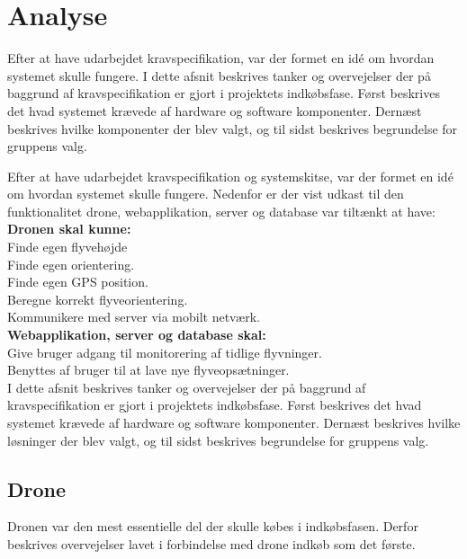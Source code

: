 \chapter{Analyse}
\label{chap:analyse}

Efter at have udarbejdet kravspecifikation, var der formet en idé om hvordan systemet skulle fungere. 
I dette afsnit beskrives tanker og overvejelser der på baggrund af kravspecifikation er gjort i projektets indkøbsfase. 
Først beskrives det hvad systemet krævede af hardware og software komponenter. 
Dernæst beskrives hvilke komponenter der blev valgt, og til sidst beskrives begrundelse for gruppens valg. 

\newpage

Efter at have udarbejdet kravspecifikation og systemskitse, var der formet en idé om hvordan systemet skulle fungere. 
Nedenfor er der vist udkast til den funktionalitet drone, webapplikation, server og database var tiltænkt at have: \\

\textbf{Dronen skal kunne:}\\
Finde egen flyvehøjde\\
Finde egen orientering.\\
Finde egen GPS position.\\
Beregne korrekt flyveorientering. \\
Kommunikere med server via mobilt netværk.\\

\textbf{Webapplikation, server og database skal:}\\
Give bruger adgang til monitorering af tidlige flyvninger.\\
Benyttes af bruger til at lave nye flyveopsætninger.\\



I dette afsnit beskrives tanker og overvejelser der på baggrund af kravspecifikation er gjort i projektets indkøbsfase. 
Først beskrives det hvad systemet krævede af hardware og software komponenter. 
Dernæst beskrives hvilke løsninger der blev valgt, og til sidst beskrives begrundelse for gruppens valg. 



\newpage

\section{Drone}
Dronen var den mest essentielle del der skulle købes i indkøbsfasen. Derfor beskrives overvejelser lavet i forbindelse med drone indkøb som det første.

